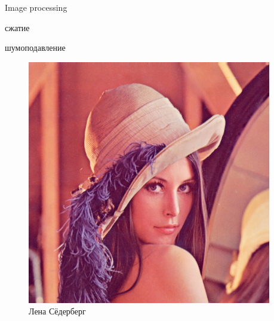 \documentclass{beamer}
\begin{document}
\begin{frame}
\begin{columns}
\begin{column}{0.4\textwidth}
			\end{column}
			
			\begin{column}{0.3\textwidth}
				
				Image processing
				
				сжатие
				
				шумоподавление
				\begin{figure}
				\includegraphics[width=\textwidth]{images/Lenna_test_image.png}
				\caption{Лена Сёдерберг}
				\end{figure}
				
			\end{column}
		\end{columns}
	\end{frame}
	
\end{document}
